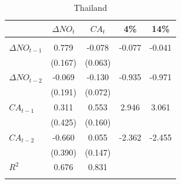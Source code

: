 \documentclass[12pt]{article}
\begin{document}
\begin{table}[h!]
\begin{center}
\caption{Thailand}			
\begin{threeparttable}

\begin{tabular}{lcccc}
&$ \Delta NO_{t} $        &$ CA_{t} $				 &4\%				&14\% \\
\hline \\[-1.8ex]

$ \Delta NO_{t - 1} $   & 0.779    &-0.078     &-0.077	&-0.041	  \\
				                &(0.167)   &(0.063)    &        &         \\
$ \Delta NO_{t - 2} $   &-0.069    &-0.130     &-0.935  &-0.971   \\
				                &(0.191)   &(0.072)    &        &         \\
$ CA_{t - 1} $          & 0.311    & 0.553     & 2.946  & 3.061   \\
				                &(0.425)   &(0.160)    &        &         \\
$ CA_{t - 2} $          &-0.660    & 0.055     &-2.362  &-2.455   \\
				                &(0.390)   &(0.147)    &        &         \\
$ R^{2} $				        & 0.676    & 0.831     &        &         \\
\hline \\[-1.8ex]


\end{tabular}


\end{threeparttable}
\end{center}
\end{table}
\end{document}
